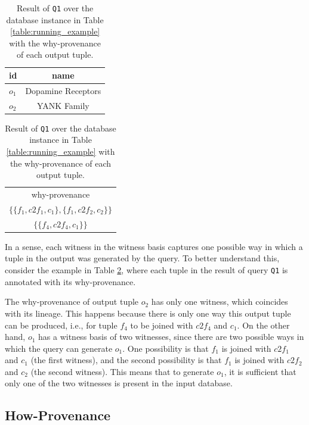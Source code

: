 \documentclass[preprint,12pt,sort&compress]{elsarticle}
\begin{document}
\begin{table}[hbt]
\centering
  \begin{tabular}{|l||c|}
  \hline
    id & name\\
    \hline
    $o_1$ &  Dopamine Receptors\\
    $o_2$ & YANK Family\\
    \hline
  \end{tabular}
  \begin{tabular}{c}
  	why-provenance   \\
  	$\{\{f_1, c2f_1, c_1\}, \{f_1, c2f_2, c_2\}\}$ \\
  	$\{\{ f_4, c2f_4, c_1\}\}$ \\
  \end{tabular}
    \caption{Result of \texttt{Q1} over the database instance in Table \ref{table:running_example} with the why-provenance of each output tuple.}
  \label{table:result_why_prov}
\end{table}
 
In a sense, each witness in the witness basis captures one possible way in which a tuple in the output was generated by the query. 
To better understand this, consider the example in Table \ref{table:result_why_prov}, where each tuple in the result of query \texttt{Q1} is annotated with its why-provenance. 

The why-provenance of output tuple $o_2$ has only one witness, which coincides with its lineage. This happens because there is only one way this output tuple can be produced, i.e., for tuple $f_4$ to be joined with $c2f_4$ and $c_1$.
On the other hand, $o_1$ has a witness basis of two witnesses, since there are two possible ways in which the query can generate $o_1$. 
One possibility is that $f_1$ is joined with $c2f_1$ and $c_1$ (the first witness), and the second possibility is that $f_1$ is joined with $c2f_2$ and $c_2$ (the second witness). This means that to generate $o_1$, it is sufficient that only one of the two witnesses is present in the input database. 

\subsection{How-Provenance}
\label{section:how_provenance_tuples}
\end{document}
